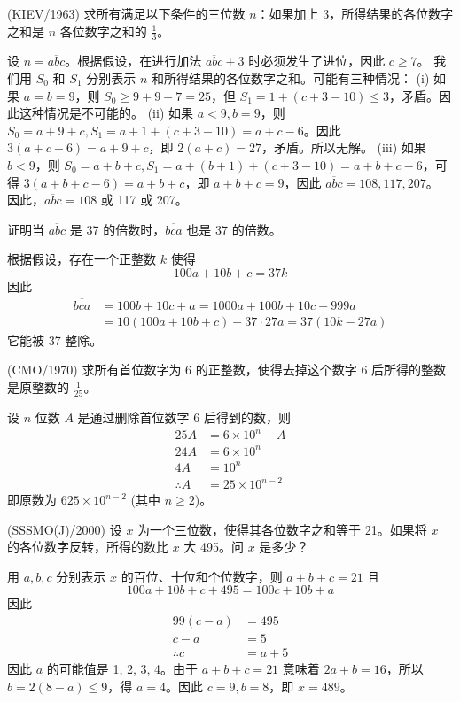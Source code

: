 \begin{questions}
\question (KIEV/1963) 求所有满足以下条件的三位数 $n$：如果加上 3，所得结果的各位数字之和是 $n$ 各位数字之和的 $\frac{1}{3}$。

\begin{solution}
设 $n = \overline{abc}$。根据假设，在进行加法 $\overline{abc} + 3$ 时必须发生了进位，因此 $c \geq 7$。
我们用 $S_0$ 和 $S_1$ 分别表示 $n$ 和所得结果的各位数字之和。可能有三种情况：
(i) 如果 $a = b = 9$，则 $S_0 \geq 9 + 9 + 7 = 25$，但 $S_1 = 1 + (c + 3 - 10) \leq 3$，矛盾。因此这种情况是不可能的。
(ii) 如果 $a < 9, b = 9$，则 $S_0 = a + 9 + c, S_1 = a + 1 + (c + 3 - 10) = a + c - 6$。因此 $3(a + c - 6) = a + 9 + c$，即 $2(a + c) = 27$，矛盾。所以无解。
(iii) 如果 $b < 9$，则 $S_0 = a + b + c, S_1 = a + (b + 1) + (c + 3 - 10) = a + b + c - 6$，可得 $3(a + b + c - 6) = a + b + c$，即 $a + b + c = 9$，因此 $\overline{abc} = 108, 117, 207$。
因此，$\overline{abc} = 108$ 或 117 或 207。
\end{solution}

\question 证明当 $\overline{abc}$ 是 37 的倍数时，$\overline{bca}$ 也是 37 的倍数。

\begin{solution}
根据假设，存在一个正整数 $k$ 使得
\[
100a + 10b + c = 37k
\]
因此
\begin{align*}
\overline{bca} &= 100b + 10c + a = 1000a + 100b + 10c - 999a \\
&= 10(100a + 10b + c) - 37 \cdot 27a = 37(10k - 27a)
\end{align*}
它能被 37 整除。
\end{solution}

\question (CMO/1970) 求所有首位数字为 6 的正整数，使得去掉这个数字 6 后所得的整数是原整数的 $\frac{1}{25}$。

\begin{solution}
设 $n$ 位数 $A$ 是通过删除首位数字 6 后得到的数，则
\begin{align*}
25A &= 6 \times 10^n + A \\
24A &= 6 \times 10^n \\
4A &= 10^n \\
\therefore A &= 25 \times 10^{n-2}
\end{align*}
即原数为 $625 \times 10^{n-2}$ (其中 $n \geq 2$)。
\end{solution}

\question (SSSMO(J)/2000) 设 $x$ 为一个三位数，使得其各位数字之和等于 21。如果将 $x$ 的各位数字反转，所得的数比 $x$ 大 495。问 $x$ 是多少？

\begin{solution}
用 $a, b, c$ 分别表示 $x$ 的百位、十位和个位数字，则 $a + b + c = 21$ 且
\[
100a + 10b + c + 495 = 100c + 10b + a
\]
因此
\begin{align*}
99(c - a) &= 495 \\
c - a &= 5 \\
\therefore c &= a + 5
\end{align*}
因此 $a$ 的可能值是 1, 2, 3, 4。由于 $a + b + c = 21$ 意味着 $2a + b = 16$，所以 $b = 2(8 - a) \leq 9$，得 $a = 4$。因此 $c = 9, b = 8$，即 $x = 489$。
\end{solution}


\end{questions}
